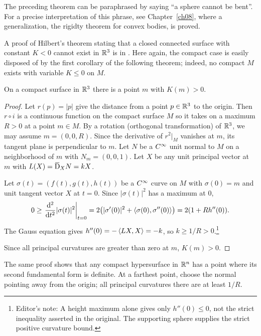 \documentclass[../main]{subfiles}
\begin{document}
The preceding theorem can be paraphrased by saying ``a sphere cannot be bent''. For a precise interpretation of this phrase, see Chapter~\ref{ch08}, where a generalization, the rigidty theorem for convex bodies, is proved.

A proof of Hilbert's theorem stating that a closed connected surface with constant $K < 0$ cannot exist in $\mathbb{R}^3$ is in \cite{willmore1959introduction}. Here again, the compact case is easily disposed of by the first corollary of the following theorem; indeed, no compact $M$ exists with variable $K \le 0$ on $M$. 



\begin{theorem} \label{thm:ch3.2.3}
On a compact surface in $\mathbb{R}^3$ there is a point $m$ with $K(m) > 0$.
\end{theorem}

\begin{proof}
Let $r(p) = |p|$ give the distance from a point $p \in \mathbb{R}^3$ to the origin. Then $r \circ i$ is a continuous function on the compact surface $M$ so it takes on a maximum $R>0$ at a point $m \in M$. By a rotation (orthogonal transformation) of $\mathbb{R}^3$, we may assume $m=(0,0,R)$. Since the derivative of $r^2|_M$ vanishes at $m$, its tangent plane is perpendicular to $m$. Let $N$ be a $C^\infty$ unit normal to $M$ on a neighborhood of $m$ with $N_m = (0, 0, 1)$. Let $X$ be any unit principal vector at $m$ with $L(X) = \covariant_X N = k X$.

Let $\sigma(t) = (f(t), g(t), h(t))$ be a $C^\infty$ curve on $M$ with $\sigma(0)=m$ and unit tangent vector $X$ at $t = 0$. Since $|\sigma(t)|^2$ has a maximum at $0$,
\[
0\ge \left.\frac{\mathrm{d}^2}{\mathrm{d}t^2}|\sigma(t)|^2\right|_{t=0}
=2\bigl(|\sigma'(0)|^2+\left\langle\sigma(0),\sigma''(0)\right\rangle\bigr)
=2(1+Rh''(0)).
\]
The Gauss equation gives $h''(0)=-\left\langle LX,X\right\rangle=-k$, so $k\ge 1/R>0$.\footnote{Editor's note: A height maximum alone gives only $h''(0)\le0$, not the strict inequality asserted in the original. The supporting sphere supplies the strict positive curvature bound.}

Since all principal curvatures are greater than zero at $m$, $K(m) > 0$.
\end{proof}



The same proof shows that any compact hypersurface in $\mathbb{R}^n$ has a point where its second fundamental form is definite. At a farthest point, choose the normal pointing away from the origin; all principal curvatures there are at least $1/R$.
\end{document}
